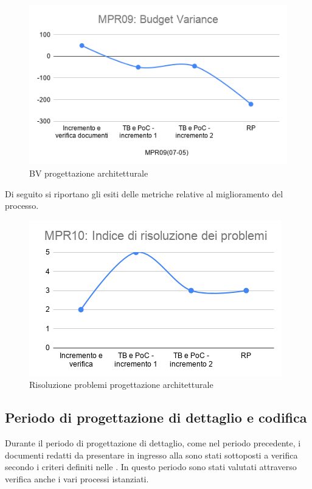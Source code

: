 \begin{figure}[h!]
	\centering
	\includegraphics[scale=0.6]{Immagini/BV_PArchitetturale.png}
	\caption{BV progettazione architetturale}
	\label{fig:BV_PArchitetturale}
\end{figure}
Di seguito si riportano gli esiti delle metriche relative al miglioramento del processo.
\begin{figure}[h!]
	\centering
	\includegraphics[scale=0.6]{Immagini/MPR10_rproblemi.png}
	\caption{Risoluzione problemi progettazione architetturale}
	\label{fig:MPR10}
\end{figure}

\subsection{Periodo di progettazione di dettaglio e codifica} \label{ResocontoPDettaglio}
Durante il periodo di progettazione di dettaglio, come nel periodo precedente, i documenti redatti da presentare in ingresso alla  sono stati sottoposti a verifica secondo i criteri definiti nelle . In questo periodo sono stati valutati attraverso verifica anche i vari processi istanziati.
\newpage
